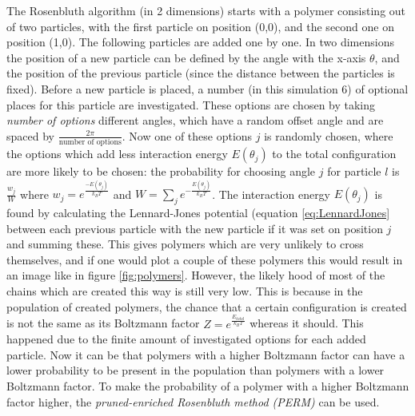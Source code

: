 \documentclass{article}
\begin{document}
\begin{multicols}{2}
The Rosenbluth algorithm (in 2 dimensions) starts with a polymer consisting out of two particles, with the first particle on position (0,0), and the second one on position (1,0). The following particles are added one by one. In two dimensions the position of a new particle can be defined by the angle with the x-axis $\theta$, and the position of the previous particle (since the distance between the particles is fixed). Before a new particle is placed, a number (in this simulation 6) of optional places for this particle are investigated. These options are chosen by taking \emph{number of options} different angles, which have a random offset angle and are spaced by $\frac{2\pi}{\textrm{number of options}}$. Now one of these options $j$ is randomly chosen, where the options which add less interaction energy  $E(\theta_j)$ to the total configuration are more likely to be chosen: the probability for choosing angle $j$ for particle $l$ is  $\frac{w_{j}}{W}$ where $w_{j}=e^{\frac{-E(\theta_j)}{k_BT}}$ and $W=\sum_{j}e^{-\frac{E(\theta_j)}{k_BT}}$. The interaction energy $E(\theta_j)$ is found by calculating the Lennard-Jones potential (equation \ref{eq:LennardJones} between each previous particle with the new particle if it was set on position $j$ and summing these. This gives polymers which are very unlikely to cross themselves, and if one would plot a couple of these polymers this would result in an image like in figure \ref{fig:polymers}. However, the likely hood of most of the chains which are created this way is still very low. This is because in the population of created polymers, the chance that a certain configuration is created is not the same as its Boltzmann factor $Z=e^{\frac{E_{total}}{k_BT}}$ whereas it should. This happened due to the finite amount of investigated options for each added particle. Now it can be that polymers with a higher Boltzmann factor can have a lower probability to be present in the population than polymers with a lower Boltzmann factor. To make the probability of a polymer with a higher Boltzmann factor higher, the \emph{pruned-enriched Rosenbluth method (PERM)} can be used. 


\end{multicols}
\end{document}
